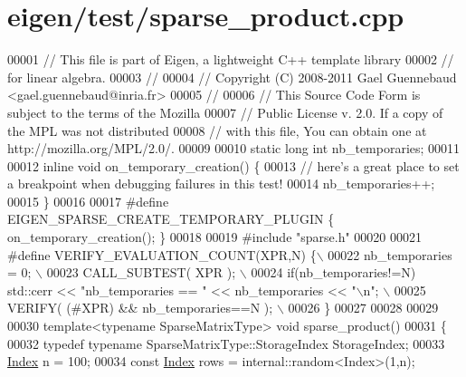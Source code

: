 \hypertarget{eigen_2test_2sparse__product_8cpp_source}{}\section{eigen/test/sparse\+\_\+product.cpp}
\label{eigen_2test_2sparse__product_8cpp_source}

\begin{DoxyCode}
00001 \textcolor{comment}{// This file is part of Eigen, a lightweight C++ template library}
00002 \textcolor{comment}{// for linear algebra.}
00003 \textcolor{comment}{//}
00004 \textcolor{comment}{// Copyright (C) 2008-2011 Gael Guennebaud <gael.guennebaud@inria.fr>}
00005 \textcolor{comment}{//}
00006 \textcolor{comment}{// This Source Code Form is subject to the terms of the Mozilla}
00007 \textcolor{comment}{// Public License v. 2.0. If a copy of the MPL was not distributed}
00008 \textcolor{comment}{// with this file, You can obtain one at http://mozilla.org/MPL/2.0/.}
00009 
00010 \textcolor{keyword}{static} \textcolor{keywordtype}{long} \textcolor{keywordtype}{int} nb\_temporaries;
00011 
00012 \textcolor{keyword}{inline} \textcolor{keywordtype}{void} on\_temporary\_creation() \{
00013   \textcolor{comment}{// here's a great place to set a breakpoint when debugging failures in this test!}
00014   nb\_temporaries++;
00015 \}
00016 
00017 \textcolor{preprocessor}{#define EIGEN\_SPARSE\_CREATE\_TEMPORARY\_PLUGIN \{ on\_temporary\_creation(); \}}
00018 
00019 \textcolor{preprocessor}{#include "sparse.h"}
00020 
00021 \textcolor{preprocessor}{#define VERIFY\_EVALUATION\_COUNT(XPR,N) \{\(\backslash\)}
00022 \textcolor{preprocessor}{    nb\_temporaries = 0; \(\backslash\)}
00023 \textcolor{preprocessor}{    CALL\_SUBTEST( XPR ); \(\backslash\)}
00024 \textcolor{preprocessor}{    if(nb\_temporaries!=N) std::cerr << "nb\_temporaries == " << nb\_temporaries << "\(\backslash\)n"; \(\backslash\)}
00025 \textcolor{preprocessor}{    VERIFY( (#XPR) && nb\_temporaries==N ); \(\backslash\)}
00026 \textcolor{preprocessor}{  \}}
00027 
00028 
00029 
00030 \textcolor{keyword}{template}<\textcolor{keyword}{typename} SparseMatrixType> \textcolor{keywordtype}{void} sparse\_product()
00031 \{
00032   \textcolor{keyword}{typedef} \textcolor{keyword}{typename} SparseMatrixType::StorageIndex StorageIndex;
00033   \hyperlink{namespace_eigen_a62e77e0933482dafde8fe197d9a2cfde}{Index} n = 100;
00034   \textcolor{keyword}{const} \hyperlink{namespace_eigen_a62e77e0933482dafde8fe197d9a2cfde}{Index} rows  = internal::random<Index>(1,n);

\end{DoxyCode}
